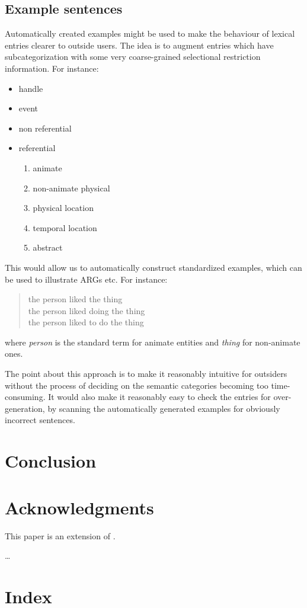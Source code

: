 \documentclass[12pt]{article}
\begin{document}
\subsection{Example sentences}
\label{sempref}

Automatically created examples might be used to
make the behaviour of lexical entries clearer to outside users.
The idea is to augment entries which have subcategorization with
some very coarse-grained selectional restriction information.  For instance:
\begin{itemize}
\item handle
\item event
\item non referential
\item referential
\begin{enumerate}
\item animate
\item non-animate physical
\item physical location
\item temporal location
\item abstract
\end{enumerate}
\end{itemize}
This would allow us to automatically construct standardized examples,
which can be used to illustrate ARGs etc.
For instance:
\begin{quote}
the person liked the thing\\
the person liked doing the thing\\
the person liked to do the thing
\end{quote}
where {\it person} is the standard term for animate entities and 
{\it thing} for non-animate ones.

The point about this approach is to make it reasonably intuitive for outsiders
without the process of deciding on the semantic categories becoming too
time-consuming.  It would also make it reasonably easy to check the
entries for over-generation, by 
scanning the automatically generated examples for obviously incorrect
sentences.

\section{Conclusion}

\section{Acknowledgments}

This paper is an extension of .

\ldots




\section*{Index}
\end{document}
